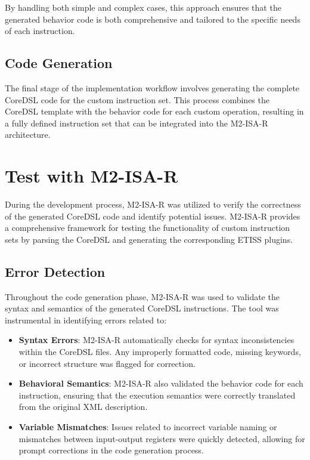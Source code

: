 By handling both simple and complex cases, this approach ensures that the generated behavior code is both comprehensive and tailored to the specific needs of each instruction.

\subsection{Code Generation}

The final stage of the implementation workflow involves generating the complete CoreDSL code for the custom instruction set. This process combines the CoreDSL template with the behavior code for each custom operation, resulting in a fully defined instruction set that can be integrated into the M2-ISA-R architecture.

\section{Test with M2-ISA-R}

During the development process, M2-ISA-R was utilized to verify the correctness of the generated CoreDSL code and identify potential issues. M2-ISA-R provides a comprehensive framework for testing the functionality of custom instruction sets by parsing the CoreDSL and generating the corresponding ETISS plugins.

\subsection{Error Detection}

Throughout the code generation phase, M2-ISA-R was used to validate the syntax and semantics of the generated CoreDSL instructions. The tool was instrumental in identifying errors related to:

\begin{itemize}
    \item \textbf{Syntax Errors}: M2-ISA-R automatically checks for syntax inconsistencies within the CoreDSL files. Any improperly formatted code, missing keywords, or incorrect structure was flagged for correction.
    \item \textbf{Behavioral Semantics}: M2-ISA-R also validated the behavior code for each instruction, ensuring that the execution semantics were correctly translated from the original XML description.
    \item \textbf{Variable Mismatches}: Issues related to incorrect variable naming or mismatches between input-output registers were quickly detected, allowing for prompt corrections in the code generation process.
\end{itemize}

